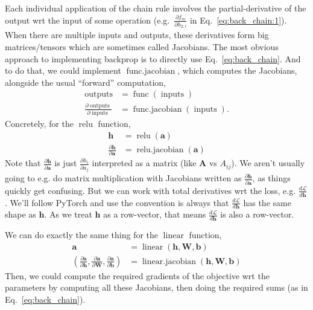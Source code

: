 \documentclass{article}
\newcommand{\dd}[2][]{\frac{\partial #1}{\partial #2}}
\newcommand{\dt}[2][]{\frac{d #1}{d #2}}
\newcommand{\dL}{\dt[\L]}
\newcommand{\bracket}[3]{\left#1 #3 \right#2}
\renewcommand{\b}{\bracket{(}{)}}
\newcommand{\h}{\mathbf{h}}
\newcommand{\bv}{\mathbf{b}}
\renewcommand{\a}{\mathbf{a}}
\newcommand{\W}{\mathbf{W}}
\renewcommand{\L}{\mathcal{L}}
\newcommand{\linear}{\operatorname{linear}}
\newcommand{\relu}{\operatorname{relu}}
\newcommand{\func}{\operatorname{func}}
\newcommand{\funcjac}{\operatorname{func{.}jacobian}}
\newcommand{\inputs}{\operatorname{inputs}}
\newcommand{\outputs}{\operatorname{outputs}}
\newcommand{\linearjac}{\operatorname{linear{.}jacobian}}
\newcommand{\relujac}{\operatorname{relu{.}jacobian}}
\begin{document}
Each individual application of the chain rule involves the partial-derivative of the output wrt the input of some operation (e.g.\ $\dd[f_m]{h_{2;l}}$ in Eq.~\ref{eq:back_chain:1}).
When there are multiple inputs and outputs, these derivatives form big matrices/tensors which are sometimes called Jacobians.
The most obvious approach to implementing backprop is to directly use Eq.~\eqref{eq:back_chain}.
And to do that, we could implement $\funcjac$, which computes the Jacobians, alongside the usual ``forward'' computation,
\begin{subequations}
\label{eq:general_jacobian}
\begin{align}
  \outputs &= \func\b{\inputs}\\
  \dd[\outputs]{\inputs} &= \funcjac\b{\inputs}.
\end{align}
\end{subequations}
Concretely, for the $\relu$ function,
\begin{subequations}
\begin{align}
  \h &= \relu\b{\a} \\ 
  \dd[\h]{\a} &= \relujac\b{\a}
\end{align}
\end{subequations}
Note that $\dd[\h]{\a}$ is just $\dd[h_i]{a_j}$ interpreted as a matrix (like $\mathbf{A}$ vs $A_{ij}$).  
We aren't usually going to e.g. do matrix multiplication with Jacobians written as $\dd[\h]{\a}$, as things quickly get confusing.
But we can work with total derivatives wrt the loss, e.g. $\dL{\h}$.
We'll follow PyTorch and use the convention is always that $\dL{\h}$ has the same shape as $\h$.
As we treat $\h$ as a row-vector, that means $\dL{\h}$ is also a row-vector.

We can do exactly the same thing for the $\linear$ function,
\begin{subequations}
\begin{align}
  \a &= \linear\b{\h, \W, \bv} \\ 
  \b{\dd[\a]{\h}, \dd[\a]{\W}, \dd[\a]{\bv}} &= \linearjac\b{\h, \W, \bv}
\end{align}
\end{subequations}
Then, we could compute the required gradients of the objective wrt the parameters by computing all these Jacobians, then doing the required sums (as in Eq.~\ref{eq:back_chain}).
\end{document}
